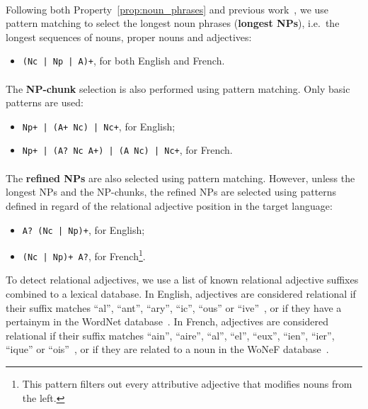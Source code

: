       \paragraph{}
      Following both Property~\ref{prop:noun_phrases} and previous
      work~\cite{hassan2010conundrums}, we use pattern matching to select the
      longest noun phrases (\textbf{longest NPs}), i.e.~the longest sequences of
      nouns, proper nouns and adjectives:
      \begin{itemize}
        \item{\texttt{(Nc | Np | A)+}, for both English and French.}
      \end{itemize}

      \paragraph{}
      The \textbf{NP-chunk} selection is also performed using pattern matching.
      Only basic patterns are used:
      \begin{itemize}
        \item{\texttt{Np+ |~(A+~Nc) |~Nc+}, for English;}
        \item{\texttt{Np+ |~(A?~Nc~A+) |~(A~Nc) |~Nc+}, for French.}
      \end{itemize}

      \paragraph{}
      The \textbf{refined NPs} are also selected using pattern matching.
      However, unless the longest NPs and the NP-chunks, the refined NPs are
      selected using patterns defined in regard of the relational adjective
      position in the target language:
      \begin{itemize}
        \item{\texttt{A? (Nc~|~Np)+}, for English;}
        \item{\texttt{(Nc~|~Np)+ A?}, for French\footnote{This pattern filters
              out every attributive adjective that modifies nouns from the
              left.}.}
      \end{itemize}
      To detect relational adjectives, we use a list of known relational
      adjective suffixes combined to a lexical database. In English, adjectives
      are considered relational if their suffix matches ``al'', ``ant'',
      ``ary'', ``ic'', ``ous'' or
      ``ive''~\cite{grabar2006terminologystructuring}, or if they have a
      pertainym in the WordNet database~\cite{miller1995wordnet}. In French,
      adjectives are considered relational if their suffix matches ``ain'',
      ``aire'', ``al'', ``el'', ``eux'', ``ien'', ``ier'', ``ique'' or
      ``ois''~\cite{harastani2013relationaladjectivetranslation}, or if they are
      related to a noun in the WoNeF database~\cite{pradet2013wonef}.

